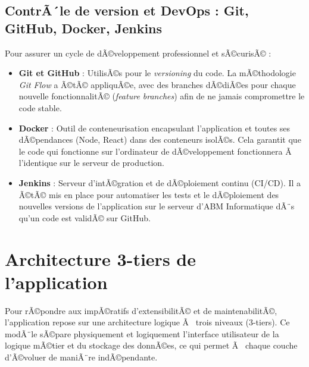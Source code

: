 \subsection{ContrÃ´le de version et DevOps : Git, GitHub, Docker, Jenkins}
Pour assurer un cycle de dÃ©veloppement professionnel et sÃ©curisÃ© :
\begin{itemize}
    \item \textbf{Git et GitHub} : UtilisÃ©s pour le \textit{versioning} du code. La mÃ©thodologie \textit{Git Flow} a Ã©tÃ© appliquÃ©e, avec des branches dÃ©diÃ©es pour chaque nouvelle fonctionnalitÃ© (\textit{feature branches}) afin de ne jamais compromettre le code stable.
    \item \textbf{Docker} : Outil de conteneurisation encapsulant l'application et toutes ses dÃ©pendances (Node, React) dans des conteneurs isolÃ©s. Cela garantit que le code qui fonctionne sur l'ordinateur de dÃ©veloppement fonctionnera Ã  l'identique sur le serveur de production.
    \item \textbf{Jenkins} : Serveur d'intÃ©gration et de dÃ©ploiement continu (CI/CD). Il a Ã©tÃ© mis en place pour automatiser les tests et le dÃ©ploiement des nouvelles versions de l'application sur le serveur d'ABM Informatique dÃ¨s qu'un code est validÃ© sur GitHub.
\end{itemize}

\section{Architecture 3-tiers de l'application}
Pour rÃ©pondre aux impÃ©ratifs d'extensibilitÃ© et de maintenabilitÃ©, l'application repose sur une architecture logique Ã  trois niveaux (3-tiers). Ce modÃ¨le sÃ©pare physiquement et logiquement l'interface utilisateur de la logique mÃ©tier et du stockage des donnÃ©es, ce qui permet Ã  chaque couche d'Ã©voluer de maniÃ¨re indÃ©pendante.

